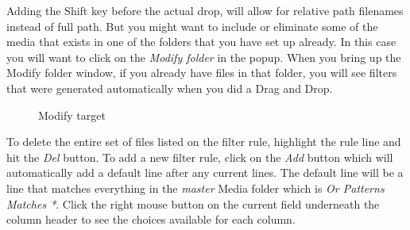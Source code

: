 Adding the Shift key before the actual drop, will allow for relative path filenames instead of full path.
But you might want to include or eliminate some of the media that exists in one of the folders that you have set up already.  
In this case you will want to click on the \textit{Modify folder} in the popup.  
When you bring up the Modify folder window, if you already have files in that folder, you will see filters that were generated automatically when you did a Drag and Drop.


\begin{figure}[htpb]
    \centering
    
    \caption{Modify target}
    \label{fig:modify-target}
\end{figure}

To delete the entire set of files listed on the filter rule, highlight the rule line and hit the \textit{Del} button.  
To add a new filter rule, click on the \textit{Add} button which will automatically add a default line after any current lines.  
The default line will be a line that matches everything in the \textit{master} Media folder which is \textit{Or  Patterns  Matches   *}.  
Click the right mouse button on the current field underneath the column header to see the choices available for each column.  

